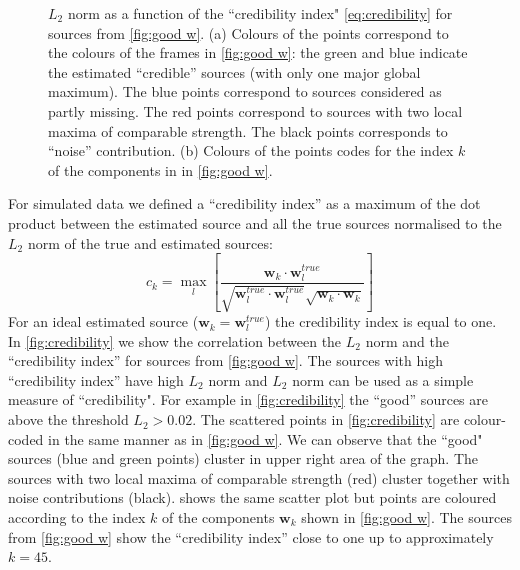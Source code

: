\begin{figure}[!b]
	\newcommand{\fw}{.5\textwidth}
	\centering
	\caption{$L_2$ norm as a function of the ``credibility index" \autoref{eq:credibility} for sources from \autoref{fig:good w}. (a) Colours of the points correspond to the colours of the frames in \autoref{fig:good w}: the green and blue indicate the estimated ``credible'' sources (with only one major global maximum). The blue points correspond to sources considered as partly missing. The red points correspond to sources with two local maxima of comparable strength. The black points corresponds to ``noise'' contribution. (b) Colours of the points codes for the index $k$ of the components in in \autoref{fig:good w}.}
	\label{fig:credibility}	
\end{figure}
%
For simulated data we defined a ``credibility index'' as a maximum of the dot product between the estimated source and all the true sources normalised to the $L_2$ norm of the true and estimated sources:
% 
\begin{equation}
	c_k=\max_l\left[\frac{\bm{w}_k\cdot\bm{w}^{true}_l}{\sqrt{\bm{w}^{true}_l\cdot\bm{w}^{true}_l}\sqrt{\bm{w}_k\cdot\bm{w}_k}}\right]
	\label{eq:credibility}
\end{equation} 
%
For an ideal estimated source ($\bm{w}_k=\bm{w}^{true}_l$) the credibility index is equal to one. In \autoref{fig:credibility} we show the correlation between the $L_2$ norm and the ``credibility index'' for sources from \autoref{fig:good w}. The sources with high ``credibility index'' have high $L_2$ norm and $L_2$ norm can be used as a simple measure of ``credibility".  For example in \autoref{fig:credibility} the ``good'' sources are above the threshold $L_2>0.02$. The scattered points in  \autoref{fig:credibility}\aaa{} are colour-coded in the same manner as in  \autoref{fig:good w}. We can observe that the ``good" sources (blue and green points) cluster in upper right area of the graph. The sources with two local maxima of comparable strength (red) cluster together with noise contributions (black). \bbb{} shows the same scatter plot but points are coloured according to the index $k$ of the components $\bm{w}_k$ shown in \autoref{fig:good w}. The sources from \autoref{fig:good w} show the ``credibility index'' close to one up to approximately $k=45$.  

